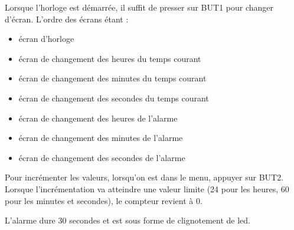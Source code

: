 
Lorsque l'horloge est démarrée, il suffit de presser sur BUT1 pour changer d'écran. L'ordre des écrans étant :

\begin{itemize}
	\item écran d'horloge
	\item écran de changement des heures du temps courant
	\item écran de changement des minutes du temps courant
	\item écran de changement des secondes du temps courant
	\item écran de changement des heures de l'alarme
	\item écran de changement des minutes de l'alarme
	\item écran de changement des secondes de l'alarme
\end{itemize}

Pour incrémenter les valeurs, lorsqu'on est dans le menu, appuyer sur BUT2. Lorsque l'incrémentation va atteindre une valeur limite (24 pour les heures, 60 pour les minutes et secondes), le compteur revient à 0.

L'alarme dure 30 secondes et est sous forme de clignotement de led. 